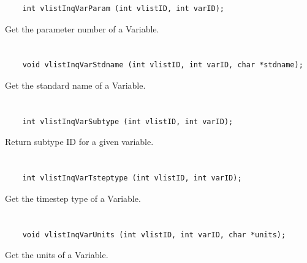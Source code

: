 \begin{verbatim}
    int vlistInqVarParam (int vlistID, int varID);
\end{verbatim}

Get the parameter number of a Variable.


\section*{\tt {}}

\begin{verbatim}
    void vlistInqVarStdname (int vlistID, int varID, char *stdname);
\end{verbatim}

Get the standard name of a Variable.


\section*{\tt {}}

\begin{verbatim}
    int vlistInqVarSubtype (int vlistID, int varID);
\end{verbatim}

Return subtype ID for a given variable.


\section*{\tt {}}

\begin{verbatim}
    int vlistInqVarTsteptype (int vlistID, int varID);
\end{verbatim}

Get the timestep type of a Variable.


\section*{\tt {}}

\begin{verbatim}
    void vlistInqVarUnits (int vlistID, int varID, char *units);
\end{verbatim}

Get the units of a Variable.


\section*{\tt {}}


